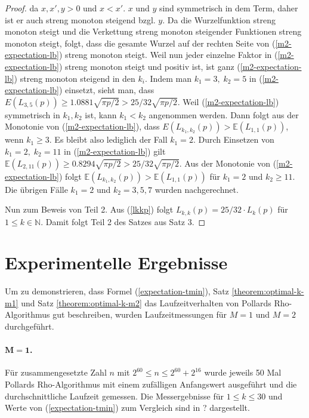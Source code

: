 \documentclass[a4paper, 10pt, ngerman]{article}
\newcommand{\E}{\mathbb{E}}
\newcommand{\N}{\mathbb{N}}
\begin{document}
\begin{proof}
    da $x, x', y > 0$ und $x < x'$. $x$ und $y$ sind symmetrisch in dem Term, daher ist er auch streng monoton steigend bzgl. $y$. Da die Wurzelfunktion streng monoton steigt und die Verkettung streng monoton steigender Funktionen streng monoton steigt, folgt, dass die gesamte Wurzel auf der rechten Seite von (\ref{m2-expectation-lb}) streng monoton steigt. Weil nun jeder einzelne Faktor in (\ref{m2-expectation-lb}) streng monoton steigt und positiv ist, ist ganz (\ref{m2-expectation-lb}) streng monoton steigend in den $k_i$. Indem man $k_1 = 3,\; k_2 = 5$ in (\ref{m2-expectation-lb}) einsetzt, sieht man, dass $E(L_{3, 5}(p)) \ge 1.0881 \sqrt{\pi p /2}  > 25 / 32 \sqrt{\pi p / 2}$. Weil (\ref{m2-expectation-lb}) symmetrisch in $k_1, k_2$ ist, kann $k_1 < k_2$ angenommen werden. Dann folgt aus der Monotonie von (\ref{m2-expectation-lb}), dass $E(L_{k_1, k_2}(p)) > \E(L_{1, 1}(p))$, wenn $k_1 \ge 3$. Es bleibt also lediglich der Fall $k_1 = 2$. Durch Einsetzen von $k_1 = 2, \; k_2 = 11$ in (\ref{m2-expectation-lb}) gilt $\E(L_{2, 11}(p)) \ge 0.8294 \sqrt{\pi p / 2} > 25 / 32 \sqrt{\pi p / 2}$. Aus der Monotonie von (\ref{m2-expectation-lb}) folgt $\E(L_{k_1, k_2}(p)) > \E(L_{1, 1}(p))$ für $k_1 = 2$ und $k_2 \ge 11$. Die übrigen Fälle $k_1 = 2$ und $k_2 = 3, 5, 7$ wurden nachgerechnet.

    Nun zum Beweis von Teil 2. Aus (\ref{lkkp}) folgt $L_{k, k}(p) = 25 / 32 \cdot L_{k}(p)$ für $1 \le k \in \N$. Damit folgt Teil 2 des Satzes aus Satz 3.
\end{proof}

\section{Experimentelle Ergebnisse}

Um zu demonstrieren, dass Formel (\ref{expectation-tmin}), Satz \ref{theorem:optimal-k-m1} und Satz \ref{theorem:optimal-k-m2} das Laufzeitverhalten von Pollards Rho-Algorithmus gut beschreiben, wurden Laufzeitmessungen für $M = 1$ und $M = 2$ durchgeführt.

\paragraph{$\pmb{M = 1}$.} Für zusammengesetzte Zahl $n$ mit $2^{60} \le n \le 2^{60} + 2^{16}$ wurde jeweils 50 Mal Pollards Rho-Algorithmus mit einem zufälligen Anfangswert ausgeführt und die durchschnittliche Laufzeit gemessen. Die Messergebnisse für $1 \le k \le 30$ und Werte von (\ref{expectation-tmin}) zum Vergleich sind in ? dargestellt.
\end{document}
